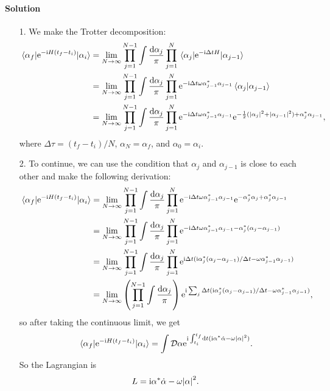 \documentclass[hyperref, a4paper]{article}
\newcommand*{\ii}{\mathrm{i}}
\newcommand*{\ee}{\mathrm{e}}
\begin{document}
\paragraph{Solution} \begin{itemize}
\item[1.] We make the Trotter decomposition:
\begin{equation}
    \begin{aligned}
        \mel{\alpha_f}{\ee^{- \ii H(t_f - t_i)}}{\alpha_i} &= \lim_{N \to \infty}
        \prod_{j=1}^{N-1} \int \frac{\dd{\alpha_j}}{\pi} \prod_{j=1}^N \mel{\alpha_j}{\ee^{- \ii \Delta t H}}{\alpha_{j-1}} \\
        &= \lim_{N\to \infty} \prod_{j=1}^{N-1} \int \frac{\dd{\alpha_j}}{\pi} \prod_{j=1}^N 
        \ee^{- \ii \Delta t \omega \alpha_{j-1}^* \alpha_{j-1}} \braket*{\alpha_j}{\alpha_{j-1}} \\
        &= \lim_{N \to \infty} \prod_{j=1}^{N-1} \int \frac{\dd{\alpha_j}}{\pi} \prod_{j=1}^N 
        \ee^{- \ii \Delta t \omega \alpha_{j-1}^* \alpha_{j-1}}
        \ee^{- \frac{1}{2} (\abs{\alpha_j}^2 + \abs{\alpha_{j-1}}^2) + \alpha_j^* \alpha_{j-1}} ,
    \end{aligned}
\end{equation}
where $\Delta \tau = (t_f - t_i) / N$, $\alpha_N = \alpha_f$,
and $\alpha_0 = \alpha_i$.

\item[2.] To continue, we can use the condition that $\alpha_j$ and $\alpha_{j-1}$ is close to each other 
and make the following derivation: 
\[
    \begin{aligned}
        \mel{\alpha_f}{\ee^{- \ii H(t_f - t_i)}}{\alpha_i} 
        &= \lim_{N \to \infty} \prod_{j=1}^{N-1} \int \frac{\dd{\alpha_j}}{\pi} \prod_{j=1}^N 
        \ee^{- \ii \Delta t \omega \alpha_{j-1}^* \alpha_{j-1}}
        \ee^{- \alpha^*_j \alpha_j + \alpha_j^* \alpha_{j-1}} \\ 
        &= \lim_{N \to \infty} \prod_{j=1}^{N-1} \int \frac{\dd{\alpha_j}}{\pi} \prod_{j=1}^N 
        \ee^{- \ii \Delta t \omega \alpha_{j-1}^* \alpha_{j-1} - \alpha_j^* (\alpha_j - \alpha_{j-1})} \\
        &= \lim_{N \to \infty} \prod_{j=1}^{N-1} \int \frac{\dd{\alpha_j}}{\pi} \prod_{j=1}^N 
        \ee^{\ii \Delta t (\ii \alpha_j^* (\alpha_j - \alpha_{j-1}) / \Delta t - \omega \alpha_{j-1}^* \alpha_{j-1}) } \\
        &= \lim_{N \to \infty} \left( \prod_{j=1}^{N-1} \int \frac{\dd{\alpha_j}}{\pi} \right)
        \ee^{\ii \sum_j \Delta t (\ii \alpha_j^* (\alpha_j - \alpha_{j-1}) / \Delta t - \omega \alpha_{j-1}^* \alpha_{j-1}) },
    \end{aligned}
\]
so after taking the continuous limit, we get 
\begin{equation}
    \mel{\alpha_f}{\ee^{- \ii H (t_f - t_i)}}{\alpha_i} = \int \mathcal{D} \alpha 
    \ee^{\ii \int_{t_i}^{t_f} \dd{t} (\ii \alpha^* \dot{\alpha} - \omega \abs{\alpha}^2 )}.
\end{equation}
So the Lagrangian is 
\begin{equation}
    L = \ii \alpha^* \dot{\alpha} - \omega \abs{\alpha}^2.
    \label{eq:lagrangian-oscillator}
\end{equation}


\end{itemize}
\end{document}
